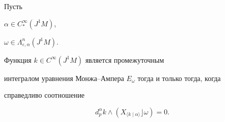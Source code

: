 \begin{prop} \label{integral5}


Пусть 


$\alpha\in C_*^\infty (J^1M)$,


$\omega\in\Lambda_{\varepsilon,\alpha}^n(J^1M)$.


Функция $k\in C^\infty (J^1M)$ является промежуточным


интегралом уравнения Монжа--Ампера $E_\omega $ тогда и только тогда, когда


справедливо соотношение


\begin{equation}


d_p^\alpha k\wedge (X_{\langle k\mid \alpha\rangle}\rfloor \omega )=0.


\label{intint}


\end{equation}


\end{prop}





